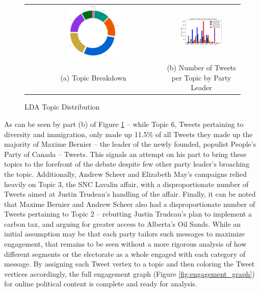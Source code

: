 \documentclass{nws}
\begin{document}
\begin{figure}[h!]
  \centering
  \begin{tabular}{cc}
    \includegraphics[width=0.40\textwidth]{Figures/topic_distribution} &
    \includegraphics[width=0.60\textwidth]{Figures/grouped_bar_by_pl_topic} \\
  (a) Topic Breakdown & (b) Number of Tweets per Topic by Party Leader \\[6pt]
  \end{tabular}
  \caption[LDA Topic Distribution]{LDA Topic Distribution}
  \label{fig:topic_distribution}
\end{figure}

As can be seen by part (b) of Figure \ref{fig:topic_distribution} -- while Topic
6, Tweets pertaining to diversity and immigration, only made up 11.5\% of all
Tweets they made up the majority of Maxime Bernier -- the leader of the newly
founded, populist People's Party of Canada -- Tweets. This signals an attempt on
his part to bring these topics to the forefront of the debate despite few other
party leader's broaching the topic. Additionally, Andrew Scheer and Elizabeth
May's campaigns relied heavily on Topic 3, the SNC Lavalin affair, with a
disproportionate number of Tweets aimed at Justin Trudeau's handling of the
affair. Finally, it can be noted that Maxime Bernier and Andrew Scheer also had
a disproportionate number of Tweets pertaining to Topic 2 -- rebutting Justin
Trudeau's plan to implement a carbon tax, and arguing for greater access to
Alberta's Oil Sands. While an initial assumption may be that each party tailors
such messages to maximize engagement, that remains to be seen without a more
rigorous analysis of how different segments or the electorate as a whole engaged
with each category of message. By assigning each Tweet vertex to a topic and
then coloring the Tweet vertices accordingly, the full engagement graph (Figure
\ref{fig:engagement_graph}) for online political content is complete and ready
for analysis. 
\end{document}
